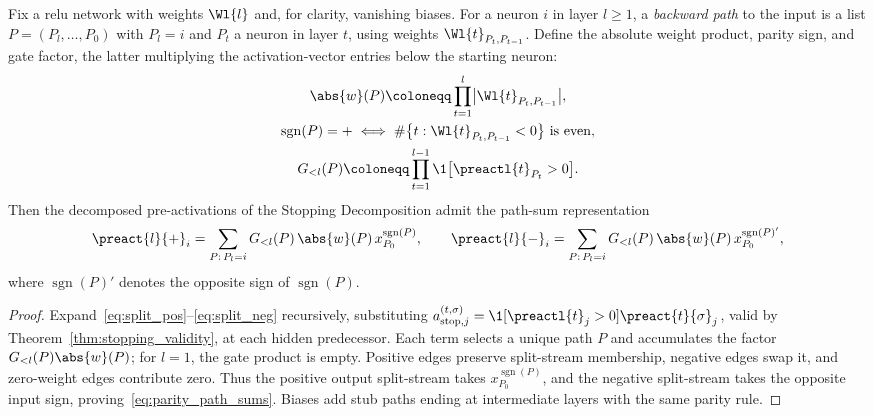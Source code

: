 \begin{lemmaenv}\label{lem:parity_path}
Fix a \ac{relu} network with weights $\Wl{l}$ and, for clarity, vanishing biases. For a neuron $i$ in layer $l \ge 1$, a \emph{backward path} to the input is a list $P = (P_l, \dots, P_0)$ with $P_l = i$ and $P_t$ a neuron in layer $t$, using weights $\Wl{t}_{P_t, P_{t-1}}$. Define the absolute weight product, parity sign, and gate factor, the latter multiplying the activation-vector entries below the starting neuron:
\begin{equation*}
\begin{gathered}
	\abs{w}(P) \coloneqq \prod_{t=1}^{l} \bigl|\Wl{t}_{P_t, P_{t-1}}\bigr|,
\\
\operatorname{sgn}(P) = + \iff \#\bigl\{ t : \Wl{t}_{P_t, P_{t-1}} < 0 \bigr\}
    \text{ is even},
\\
	G_{<l}(P) \coloneqq \prod_{t=1}^{l-1} \1\bigl[\preactl{t}_{P_t} > 0\bigr].
\end{gathered}
\end{equation*}
Then the decomposed pre-activations of the Stopping Decomposition admit the path-sum representation
\begin{equation}
	\preact{l}{+}_i = \sum_{P :\, P_l = i} G_{<l}(P)\, \abs{w}(P)\, x_{P_0}^{\operatorname{sgn}(P)},
	\qquad
	\preact{l}{-}_i = \sum_{P :\, P_l = i} G_{<l}(P)\, \abs{w}(P)\, x_{P_0}^{\operatorname{sgn}(P)'},
	\label{eq:parity_path_sums}
\end{equation}
where $\operatorname{sgn}(P)' $ denotes the opposite sign of $\operatorname{sgn}(P)$.\end{lemmaenv}

\begin{proof}
Expand~\eqref{eq:split_pos}--\eqref{eq:split_neg} recursively, substituting $a_{\mathrm{stop},j}^{(t,\sigma)}=\1[\preactl{t}_j>0]\preact{t}{\sigma}_j$, valid by Theorem~\ref{thm:stopping_validity}, at each hidden predecessor. Each term selects a unique path $P$ and accumulates the factor $G_{<l}(P)\abs{w}(P)$; for $l=1$, the gate product is empty. Positive edges preserve split-stream membership, negative edges swap it, and zero-weight edges contribute zero. Thus the positive output split-stream takes $x_{P_0}^{\operatorname{sgn}(P)}$, and the negative split-stream takes the opposite input sign, proving~\eqref{eq:parity_path_sums}. Biases add stub paths ending at intermediate layers with the same parity rule.
\end{proof}

